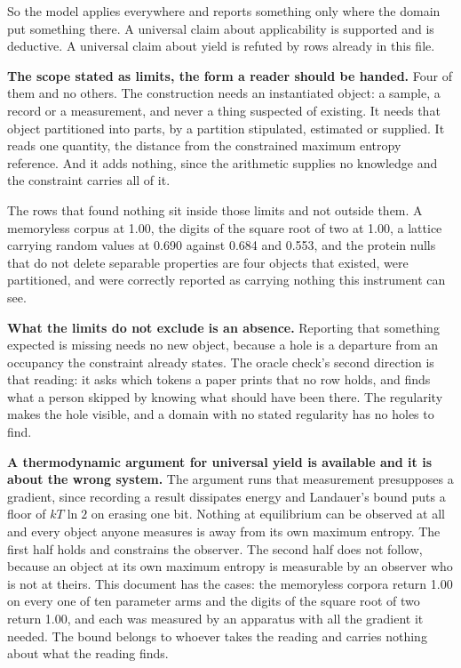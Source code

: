 So the model applies everywhere and reports something only where the domain put something there. A universal claim about applicability is supported and is deductive. A universal claim about yield is refuted by rows already in this file.

\textbf{The scope stated as limits, the form a reader should be handed.} Four of them and no others. The construction needs an instantiated object: a sample, a record or a measurement, and never a thing suspected of existing. It needs that object partitioned into parts, by a partition stipulated, estimated or supplied. It reads one quantity, the distance from the constrained maximum entropy reference. And it adds nothing, since the arithmetic supplies no knowledge and the constraint carries all of it.

The rows that found nothing sit inside those limits and not outside them. A memoryless corpus at 1.00, the digits of the square root of two at 1.00, a lattice carrying random values at 0.690 against 0.684 and 0.553, and the protein nulls that do not delete separable properties are four objects that existed, were partitioned, and were correctly reported as carrying nothing this instrument can see.

\textbf{What the limits do not exclude is an absence.} Reporting that something expected is missing needs no new object, because a hole is a departure from an occupancy the constraint already states. The oracle check's second direction is that reading: it asks which tokens a paper prints that no row holds, and finds what a person skipped by knowing what should have been there. The regularity makes the hole visible, and a domain with no stated regularity has no holes to find.

\textbf{A thermodynamic argument for universal yield is available and it is about the wrong system.} The argument runs that measurement presupposes a gradient, since recording a result dissipates energy and Landauer's bound puts a floor of \(kT\ln 2\) on erasing one bit. Nothing at equilibrium can be observed at all and every object anyone measures is away from its own maximum entropy. The first half holds and constrains the observer. The second half does not follow, because an object at its own maximum entropy is measurable by an observer who is not at theirs. This document has the cases: the memoryless corpora return 1.00 on every one of ten parameter arms and the digits of the square root of two return 1.00, and each was measured by an apparatus with all the gradient it needed. The bound belongs to whoever takes the reading and carries nothing about what the reading finds.

